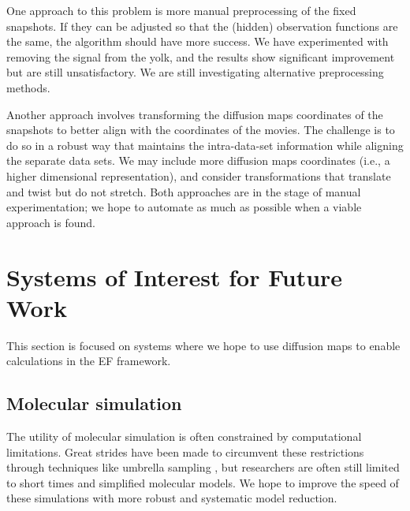 \documentclass[12pt]{article}
\begin{document}
One approach to this problem is more manual preprocessing of the fixed snapshots. If they can be adjusted so that the (hidden) observation functions are the same, the algorithm should have more success. We have experimented with removing the signal from the yolk, and the results show significant improvement but are still unsatisfactory. We are still investigating alternative preprocessing methods. \vspace{1mm}

Another approach involves transforming the diffusion maps coordinates of the snapshots to better align with the coordinates of the movies. The challenge is to do so in a robust way that maintains the intra-data-set information while aligning the separate data sets. We may include more diffusion maps coordinates (i.e., a higher dimensional representation), and consider transformations that translate and twist but do not stretch. Both approaches are in the stage of manual experimentation; we hope to automate as much as possible when a viable approach is found. \vspace{1mm}

\section{Systems of Interest for Future Work}

This section is focused on systems where we hope to use diffusion maps to enable calculations in the EF framework.

\subsection{Molecular simulation}

The utility of molecular simulation is often constrained by computational limitations. Great strides have been made to circumvent these restrictions through techniques like umbrella sampling \cite{Torrie1977}, but researchers are often still limited to short times and simplified molecular models. We hope to improve the speed of these simulations with more robust and systematic model reduction. \vspace{1mm}
\end{document}

